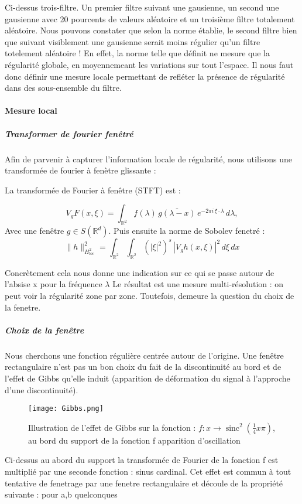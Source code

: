 \documentclass[12pt,a4paper]{article}
\begin{document}
Ci-dessus trois-filtre. Un premier filtre suivant une gausienne, un second une gausienne avec 20 pourcents de valeurs aléatoire et un troisième filtre totalement aléatoire. Nous pouvons constater que selon la norme établie, le second filtre bien que suivant visiblement une gausienne serait moins régulier qu'un filtre totelement  aléatoire ! En effet, la norme telle que définit ne mesure que la régularité globale, en moyennemeant les variations sur tout l'espace.  Il nous faut donc définir une mesure locale permettant de refléter la présence de régularité dans des sous-ensemble du filtre. 
\paragraph{Mesure local}
\subparagraph{Transformer de fourier fenêtré}
Afin de parvenir à capturer l'information locale de régularité, nous utilisons une transformée de fourier à fenètre glissante : 


La transformée de Fourier à fenêtre (STFT) est :

\[
V_g F(x, \xi) = \int_{\mathbb{R}^2} f(\lambda) \, \overline{g(\lambda-x)} \, e^{-2\pi i \, \xi \cdot \lambda} \, d\lambda,
\]
Avec une fenêtre 
$g \in S(\mathbb{R}^d)$.
Puis ensuite la norme de Sobolev fenetré : 
\[
\|h\|_{H^2_{\mathrm{loc}}}^2 = \int_{\mathbb{R}^2} \int_{\mathbb{R}^2} (|\xi|^2)^s \, |V_g h(x, \xi)|^2 \, d\xi \, dx
\]

Concrètement cela nous donne une indication sur ce qui se passe autour de l'absise x pour la fréquence $\lambda$
Le résultat est une mesure multi-résolution : on peut voir la régularité zone par zone. Toutefois, demeure la question du choix de la fenetre. 
\subparagraph{Choix de la fenêtre}
Nous cherchons une fonction régulière centrée autour de l'origine. Une fenêtre rectangulaire n'est pas un bon choix du fait de la discontinuité au bord et de l'effet de Gibbs qu'elle induit (apparition de déformation du signal à l'approche d'une discontinuité).

\begin{figure}[H] %
    \centering    %
    \texttt{[image: Gibbs.png]} %
    \caption{Illustration de l'effet de Gibbs sur la fonction : $f : x \longrightarrow  \operatorname{sinc}^2( \frac{1}{4}x \pi) $, au bord du support de la fonction f apparition d'oscillation} %
    \label{fig:mon_image} %
\end{figure}
Ci-dessus au abord du support la transformée de Fourier de la fonction f est multiplié par une seconde fonction : sinus cardinal. 
Cet effet est commun à tout tentative de fenetrage par une fenetre rectangulaire et découle de la propriété suivante :  pour a,b quelconques
\end{document}
